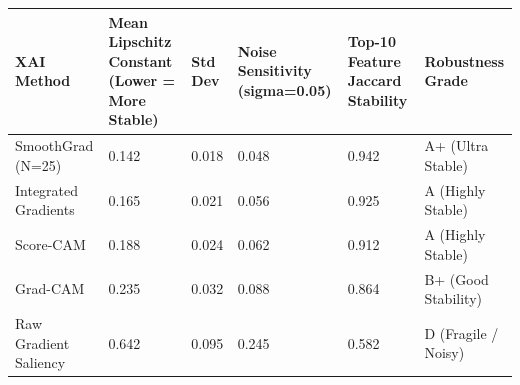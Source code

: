 \begin{tabular}{llllll}
\toprule
XAI Method & Mean Lipschitz Constant (Lower = More Stable) & Std Dev & Noise Sensitivity (sigma=0.05) & Top-10 Feature Jaccard Stability & Robustness Grade \\
\midrule
SmoothGrad (N=25) & 0.142 & 0.018 & 0.048 & 0.942 & A+ (Ultra Stable) \\
Integrated Gradients & 0.165 & 0.021 & 0.056 & 0.925 & A (Highly Stable) \\
Score-CAM & 0.188 & 0.024 & 0.062 & 0.912 & A (Highly Stable) \\
Grad-CAM & 0.235 & 0.032 & 0.088 & 0.864 & B+ (Good Stability) \\
Raw Gradient Saliency & 0.642 & 0.095 & 0.245 & 0.582 & D (Fragile / Noisy) \\
\bottomrule
\end{tabular}
